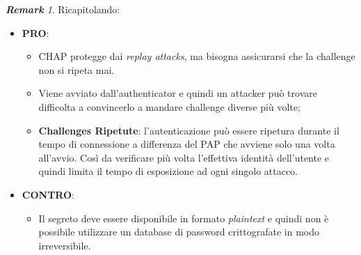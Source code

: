 \documentclass{article}
\theoremstyle{remark}
\newtheorem*{remark}{\textbf{Remark}}
\begin{document}
\begin{remark}
Ricapitolando:\begin{itemize}
    \item \textbf{PRO}:\begin{itemize}
        \item CHAP protegge dai \emph{replay attacks}, ma bisogna assicurarsi che la challenge non si ripeta mai.
        \item Viene avviato dall'authenticator e quindi un attacker può trovare difficolta a convincerlo a mandare challenge diverse più volte;
        \item \textbf{Challenges Ripetute}: l'autenticazione può essere ripetura durante il tempo di connessione a differenza del PAP che avviene solo una volta all'avvio. Così da verificare più volta l'effettiva identità dell'utente e quindi limita il tempo di esposizione ad ogni singolo attacco.
    \end{itemize}
    \item \textbf{CONTRO}:\begin{itemize}
        \item Il segreto deve essere disponibile in formato \emph{plaintext} e quindi non è possibile utilizzare un database di password crittografate in modo irreversibile.
    \end{itemize}
\end{itemize}
\end{remark}
\end{document}
